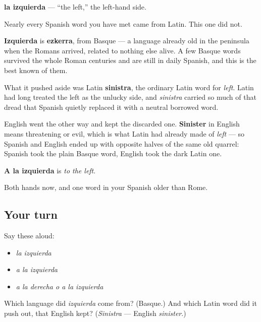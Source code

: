 \begin{cousinweb}
\textbf{la izquierda} — \textquotedblleft{}the left,\textquotedblright{} the left-hand side.

Nearly every Spanish word you have met came from Latin. This one did not.

\textbf{Izquierda} is \textbf{ezkerra}, from Basque — a language already old in the peninsula when the Romans arrived, related to nothing else alive. A few Basque words survived the whole Roman centuries and are still in daily Spanish, and this is the best known of them.

What it pushed aside was Latin \textbf{sinistra}, the ordinary Latin word for \emph{left}. Latin had long treated the left as the unlucky side, and \emph{sinistra} carried so much of that dread that Spanish quietly replaced it with a neutral borrowed word.

English went the other way and kept the discarded one. \textbf{Sinister} in English means threatening or evil, which is what Latin had already made of \emph{left} — so Spanish and English ended up with opposite halves of the same old quarrel: Spanish took the plain Basque word, English took the dark Latin one.

\textbf{A la izquierda} is \emph{to the left}.
\end{cousinweb}

\begin{grammarlens}[title={What you've built}]
Both hands now, and one word in your Spanish older than Rome.
\end{grammarlens}

\subsection*{Your turn}
Say these aloud:

\begin{itemize}
\raggedright
  \item \emph{la izquierda}
  \item \emph{a la izquierda}
  \item \emph{a la derecha o a la izquierda}
\end{itemize}

\begin{tcolorbox}[breakable,colback=teal!4,colframe=teal!35!black,title={Before you move on}]
Which language did \emph{izquierda} come from? (Basque.) And which Latin word did it push out, that English kept? (\emph{Sinistra} — English \emph{sinister}.)
\end{tcolorbox}
